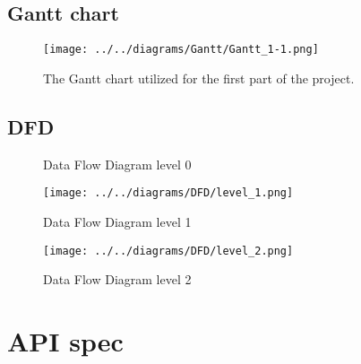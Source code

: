 \vspace*{\fill}
\subsection*{Gantt chart}
\vspace*{\fill}
\pagebreak

\begin{landscape}
    \begin{figure}
        \centering
        \texttt{[image: ../../diagrams/Gantt/Gantt\_1-1.png]}
        \caption{The Gantt chart utilized for the first part of the project.}
    \end{figure}
\end{landscape}
\pagebreak

\vspace*{\fill}
\subsection*{DFD}
\vspace*{\fill}
\pagebreak


\begin{landscape}
    \begin{figure}
        \centering
        
        \caption{Data Flow Diagram level 0}
    \end{figure}
\end{landscape}
\pagebreak


\begin{landscape}
    \begin{figure}
        \centering
        \texttt{[image: ../../diagrams/DFD/level\_1.png]}
        \caption{Data Flow Diagram level 1}
    \end{figure}
\end{landscape}
\pagebreak


\begin{landscape}
    \begin{figure}
        \centering
        \texttt{[image: ../../diagrams/DFD/level\_2.png]}
        \caption{Data Flow Diagram level 2}
    \end{figure}
\end{landscape}
\pagebreak

\vspace*{\fill}
\section{API spec}
\vspace*{\fill}
\pagebreak

